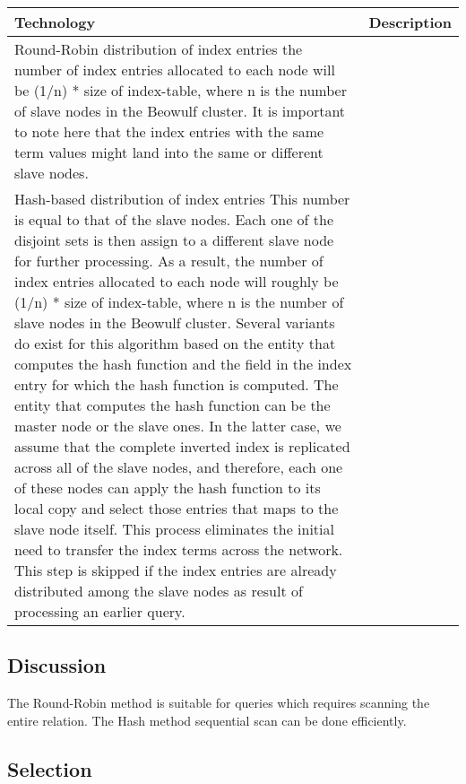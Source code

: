 \begin{center}
    \begin{tabular}{ | l | p{10cm} |} 
    \hline
    Technology & Description    \\ \hline
    Round-Robin distribution of index entries 
    the number of index entries allocated to each node will be (1/n) * size of index-table, where n is the number of slave nodes in the      Beowulf cluster. It is important to note here that the index entries with the same term values might land into the same or different slave nodes.   \\ \hline
    Hash-based distribution of index entries
    This number is equal to that of the slave nodes. Each one of the disjoint sets is then assign to a different slave node for further processing. As a result, the number of index entries allocated to each node will roughly be (1/n) * size of index-table, where n is the number of slave nodes in the Beowulf cluster. Several variants do exist for this algorithm based on the entity that computes the hash function and the field in the index entry for which the hash function is computed. The entity that computes the hash function can be the master node or the slave ones. In the latter case, we assume that the complete inverted index is replicated across all of the slave nodes, and therefore, each one of these nodes can apply the hash function to its local copy and select those entries that maps to the slave node itself. This process eliminates the initial need to transfer the index terms across the network. This step is skipped if the index entries are already distributed among the slave nodes as result of processing an earlier query. \\ \hline
    \end{tabular}
\end{center}

\subsection{Discussion}

The Round-Robin method is suitable for queries which requires scanning the entire relation. 
The Hash method sequential scan can be done efficiently.

\subsection{Selection}

